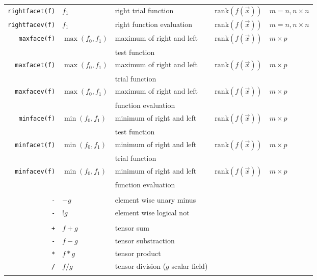 \begin{longtable}[c]{rllll}
  \lstinline!rightfacet(f)! & $f_1$ & right  trial function & $\mathrm{rank}( f(\overrightarrow{x}))$   & $m=n, n\times n$\\
  \lstinline!rightfacev(f)! & $f_1$ & right   function evaluation & $\mathrm{rank}( f(\overrightarrow{x}))$   & $m=n, n\times n$\\

  \lstinline!maxface(f)! & $\max(f_0,f_1)$ & maximum of right and left & $\mathrm{rank}( f(\overrightarrow{x}))$   & $m\times p$\\
  && test   function&&\\
  \lstinline!maxfacet(f)! & $\max(f_0,f_1)$ & maximum of right and left & $\mathrm{rank}( f(\overrightarrow{x}))$   & $m\times p$\\
  && trial   function&&\\
  \lstinline!maxfacev(f)! & $\max(f_0,f_1)$ & maximum of right and left & $\mathrm{rank}( f(\overrightarrow{x}))$   & $m\times p$\\
  && function evaluation&&\\
  \lstinline!minface(f)! & $\min(f_0,f_1)$ & minimum of right and left & $\mathrm{rank}( f(\overrightarrow{x}))$   & $m\times p$\\
  && test   function&&\\
  \lstinline!minfacet(f)! & $\min(f_0,f_1)$ & minimum of right and left & $\mathrm{rank}( f(\overrightarrow{x}))$   & $m\times p$\\
  && trial   function&&\\
  \lstinline!minfacev(f)! & $\min(f_0,f_1)$ & minimum of right and left & $\mathrm{rank}( f(\overrightarrow{x}))$   & $m\times p$\\
  && function evaluation&&\\
  \hline\\
  \lstinline!-! & $-g$ & element wise unary minus  & & \\
  \lstinline!-! & $!g$ & element wise logical not  & & \\\hline\\

  \lstinline!+! & $f+g$ & tensor sum  & & \\
  \lstinline!-! & $f-g$ & tensor substraction  & & \\
  \lstinline!*! & $f*g$ & tensor product  & & \\
  \lstinline!/! & $f/g$ & tensor division ($g$ scalar field)  & & \\\hline\\


\end{longtable}
